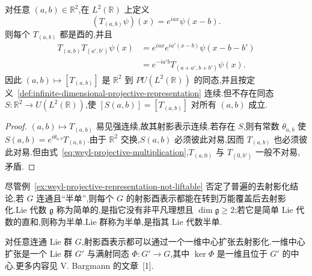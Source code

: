 {\begin{example}[不能去射影化的无限维表示]\label{ex:weyl-projective-representation-not-liftable}
对任意 $(a,b)\in\mathbb R^2$,在 $L^2(\mathbb R)$ 上定义
\[
(T_{(a,b)}\psi)(x)=e^{iax}\psi(x-b).
\]
则每个 $T_{(a,b)}$ 都是酉的,并且
\[
\begin{aligned}
T_{(a,b)}T_{(a',b')}\psi(x)
&=e^{iax}e^{ia'(x-b)}\psi(x-b-b')\\
&=e^{-ia'b}T_{(a+a',b+b')}\psi(x).
\end{aligned}
\label{eq:weyl-projective-multiplication}
\]
因此 $(a,b)\mapsto[T_{(a,b)}]$ 是 $\mathbb R^2$ 到 $PU(L^2(\mathbb R))$ 的同态,并且按定义~\ref{def:infinite-dimensional-projective-representation} 连续.但不存在同态 $S:\mathbb R^2\to U(L^2(\mathbb R))$,使 $[S(a,b)]=[T_{(a,b)}]$ 对所有 $(a,b)$ 成立.
\end{example}

\begin{proof}
$(a,b)\mapsto T_{(a,b)}$ 易见强连续,故其射影表示连续.若存在 $S$,则有常数 $\theta_{a,b}$ 使 $S(a,b)=e^{i\theta_{a,b}}T_{(a,b)}$.由于 $\mathbb R^2$ 交换,$S(a,b)$ 必须彼此对易,因而 $T_{(a,b)}$ 也必须彼此对易.但由式~\eqref{eq:weyl-projective-multiplication},$T_{(a,0)}$ 与 $T_{(0,b')}$ 一般不对易,矛盾.
\end{proof}

尽管例~\ref{ex:weyl-projective-representation-not-liftable} 否定了普遍的去射影化结论,若 $G$ 连通且“半单”,则每个 $G$ 的射影酉表示都能在转到万能覆盖后去射影化.Lie 代数 $\mathfrak g$ 称为简单的,是指它没有非平凡理想且 $\dim\mathfrak g\geq2$;若它是简单 Lie 代数的直和,则称为半单.Lie 群称为半单,是指其 Lie 代数半单.

对任意连通 Lie 群 $G$,射影酉表示都可以通过一个一维中心扩张去射影化.一维中心扩张是一个 Lie 群 $G'$ 与满射同态 $\Phi:G'\to G$,其中 $\ker\Phi$ 是一维且位于 $G'$ 的中心.更多内容见 V. Bargmann 的文章~[1].
}

